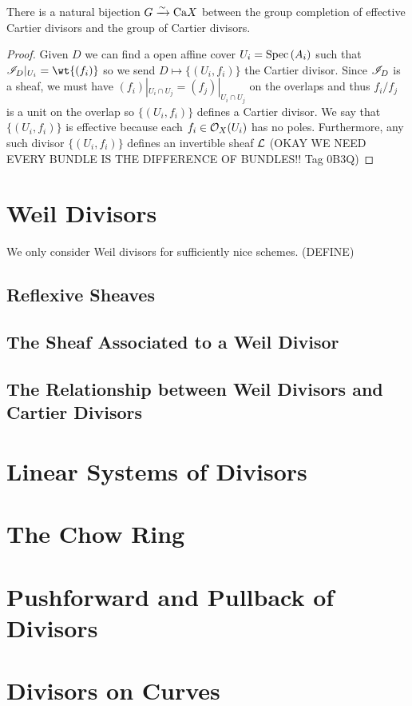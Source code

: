 \documentclass[12pt]{article}
\begin{document}
\begin{thm}
There is a natural bijection $G \xrightarrow{\sim} \mathrm{Ca}{X}$ between the group completion of effective Cartier divisors and the group of Cartier divisors. 
\end{thm}

\begin{proof}
Given $D$ we can find a open affine cover $U_i = \mathrm{Spec}\left( A_i \right)$ such that $\I_D |_{U_i} = \wt{(f_i)}$ so we send $D \mapsto \{ (U_i, f_i) \}$ the Cartier divisor. Since $\mathscr{I}_D$ is a sheaf, we must have $(f_i) |_{U_i \cap U_j} = (f_j) |_{U_i \cap U_j}$ on the overlaps and thus $f_i / f_j$ is a unit on the overlap so $ \{ (U_i, f_i) \}$ defines a Cartier divisor. We say that $ \{ (U_i, f_i) \}$ is effective because each $f_i \in \mathcal{O}_{X}(U_i)$ has no poles. Furthermore, any such divisor $\{ (U_i, f_i) \}$ defines an invertible sheaf $\mathcal{L}$ (OKAY WE NEED EVERY BUNDLE IS THE DIFFERENCE OF BUNDLES!! Tag 0B3Q) 
\end{proof}

\section{Weil Divisors}

We only consider Weil divisors for sufficiently nice schemes. (DEFINE)

\subsection{Reflexive Sheaves}

\subsection{The Sheaf Associated to a Weil Divisor}

\subsection{The Relationship between Weil Divisors and Cartier Divisors}

\section{Linear Systems of Divisors}

\section{The Chow Ring}

\section{Pushforward and Pullback of Divisors}

\section{Divisors on Curves}
\end{document}
